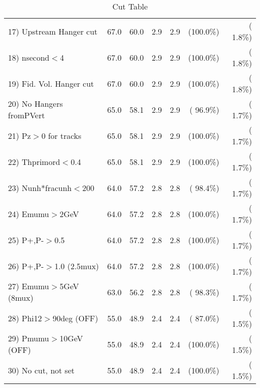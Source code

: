 \begin{table}[h!]
\begin{tabular}{||l||r|r|r|r|r|r||}
 17) Upstream Hanger cut  &         67.0 &         60.0 &          2.9 &          2.9 & (100.0\%) & (  1.8\%) \\
 18) nsecond$<$4          &         67.0 &         60.0 &          2.9 &          2.9 & (100.0\%) & (  1.8\%) \\
 19) Fid. Vol. Hanger cut &         67.0 &         60.0 &          2.9 &          2.9 & (100.0\%) & (  1.8\%) \\
 20) No Hangers fromPVert &         65.0 &         58.1 &          2.9 &          2.9 & ( 96.9\%) & (  1.7\%) \\
 21) Pz$>$0 for tracks    &         65.0 &         58.1 &          2.9 &          2.9 & (100.0\%) & (  1.7\%) \\
 22) Thprimord$<$0.4      &         65.0 &         58.1 &          2.9 &          2.9 & (100.0\%) & (  1.7\%) \\
 23) Nunh*fracunh$<$200   &         64.0 &         57.2 &          2.8 &          2.8 & ( 98.4\%) & (  1.7\%) \\
 24) Emumu$>$2GeV         &         64.0 &         57.2 &          2.8 &          2.8 & (100.0\%) & (  1.7\%) \\
 25) P+,P-$>$0.5          &         64.0 &         57.2 &          2.8 &          2.8 & (100.0\%) & (  1.7\%) \\
 26) P+,P-$>$1.0 (2.5mux) &         64.0 &         57.2 &          2.8 &          2.8 & (100.0\%) & (  1.7\%) \\
 27) Emumu$>$5GeV  (8mux) &         63.0 &         56.2 &          2.8 &          2.8 & ( 98.3\%) & (  1.7\%) \\
 28) Phi12$>$90deg  (OFF) &         55.0 &         48.9 &          2.4 &          2.4 & ( 87.0\%) & (  1.5\%) \\
 29) Pmumu$>$10GeV  (OFF) &         55.0 &         48.9 &          2.4 &          2.4 & (100.0\%) & (  1.5\%) \\
 30) No cut, not set      &         55.0 &         48.9 &          2.4 &          2.4 & (100.0\%) & (  1.5\%) \\
 \hline
 \hline
 \end{tabular}
 \caption{Cut Table           }
 \label{tab-cutcohjpsi-mumu_cohphi0}
 \end{table}
